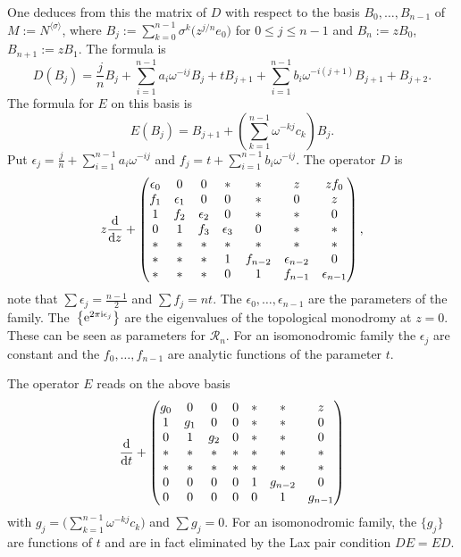 \documentclass[10pt,a4paper]{amsart}
\numberwithin{equation}{section}
\begin{document}
 One deduces from this the matrix of $D$ with respect to the basis $B_0,\dots ,B_{n-1}$ of $M:=N^{\langle\sigma\rangle}$,
 where $B_j:=\sum_{k=0}^{n-1} \sigma^k\bigl(z^{j/n}e_0\bigr)$ for $0\leq j\leq n-1$ and $B_n:=zB_0$, $
 B_{n+1}:=zB_1$. The formula is
 \[D(B_j)=\frac{j}{n}B_j+\sum _{i=1}^{n-1}a_i\omega^{-ij}B_j+tB_{j+1}+\sum_{i=1}^{n-1}b_i\omega^{-i(j+1)}B_{j+1}+B_{j+2}.\]
 The formula for $E$ on this basis is
 \[
 E(B_j)= B_{j+1}+\left(\sum _{k=1}^{n-1}\omega^{-kj}c_k\right)B_j.
 \]
 Put $\epsilon_j=\frac{j}{n}+\sum _{i=1}^{n-1}a_i\omega^{-ij}$ and $f_j=t+\sum_{i=1}^{n-1} b_i\omega^{-ij}$. The operator $D$ is
\[
 z\frac{{\rm d}}{{\rm d}z} + \left(\begin{matrix}
 \epsilon_0 &0 &0 &* &* &z & zf_0\\
 f_1 & \epsilon_1& 0 &0 &* & 0 & z \\
 1 & f_2 & \epsilon_2 & 0 & * & * & 0 \\
 0 & 1 & f_3 &\epsilon_3 & 0 & * & * \\
 * & * & * & * & * & * & * \\
 * & * & * & 1 & f_{n-2} &\epsilon_{n-2} & 0 \\
 * & * & * & 0 & 1 & f_{n-1} & \epsilon_{n-1}
 \end{matrix}\right),
 \]
 note that $\sum \epsilon _j=\frac{n-1}{2}$ and $\sum f_j=nt$.
The $\epsilon_0,\dots ,\epsilon_{n-1}$ are the parameters of the family.
 The~$\bigl\{{\rm e}^{2\pi {\rm i} \epsilon_j}\bigr\}$ are the eigenvalues of the topological monodromy at $z=0$. These can be seen as parameters for $\mathcal{R}_n$. For an isomonodromic family the $\epsilon_j$ are constant and the
$f_0,\dots ,f_{n-1}$ are analytic functions of the parameter $t$.

 The operator $E$ reads on the above basis
\[\frac{{\rm d}}{{\rm d}t}+ \left(\begin{matrix}
 g_0 &0 &0 &0 &* &* & z\\
 1 & g_1& 0 &0 &* & * & 0 \\
 0 & 1 & g_2 & 0 & * & * & 0 \\
 * & * & * & * & * & * & * \\
 * & * & * & * &* & * & * \\
 0 & 0 & 0 & 0 & 1 &g_{n-2} & 0 \\
 0 & 0 & 0 & 0 & 0 & 1 & g_{n-1}
 \end{matrix}\right)
 \]
with $g_j=\bigl(\sum _{k=1}^{n-1}\omega^{-kj}c_k\bigr)$ and $\sum g_j=0$.
For an isomonodromic family, the $\{g_j\}$ are functions of $t$ and are in fact eliminated by the Lax pair
condition $DE=ED$.
\end{document}
